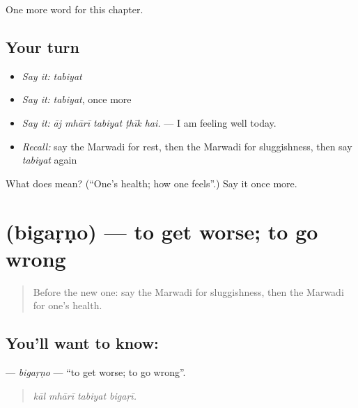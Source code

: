 \begin{grammarlens}[title={What you've built}]
One more word for this chapter.
\end{grammarlens}

\subsection*{Your turn}
\begin{itemize}
\raggedright
  \item \emph{Say it:} \emph{tabiyat}
  \item \emph{Say it:} \emph{tabiyat}, once more
  \item \emph{Say it:} \emph{āj mhārī tabiyat ṭhīk hai.} — I am feeling well today.
  \item \emph{Recall:} say the Marwadi for rest, then the Marwadi for sluggishness, then say \emph{tabiyat} again
\end{itemize}

\begin{tcolorbox}[breakable,colback=teal!4,colframe=teal!35!black,title={Before you move on}]
What does  mean? (\textquotedblleft{}One's health; how one feels\textquotedblright{}.) Say it once more.
\end{tcolorbox}
\section[\texorpdfstring{\mw{बिगड़णो} (bigaṛṇo)}{बिगड़णो (bigaṛṇo)}]{ (bigaṛṇo) — to get worse; to go wrong}

\label{lesson:MW-C255-bigarno}



\begin{quote}
Before the new one: say the Marwadi for sluggishness, then the Marwadi for one's health.
\end{quote}

\subsection*{You'll want to know: }
\textbf{} — \emph{bigaṛṇo} — \textquotedblleft{}to get worse; to go wrong\textquotedblright{}.

\begin{quote}
   
\end{quote}

\begin{quote}
\emph{kāl mhārī tabiyat bigaṛī.}
\end{quote}

